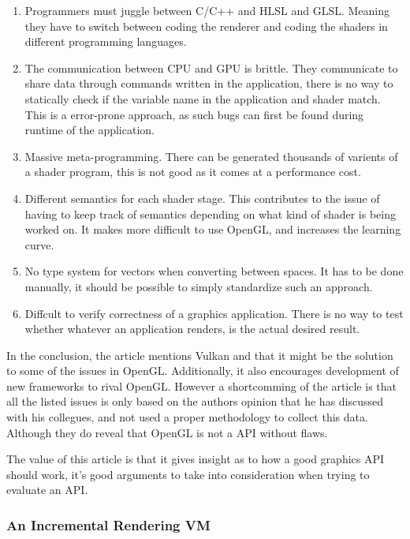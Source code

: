 \begin{enumerate}
\item Programmers must juggle between C/C++ and \gls{HLSL} and \gls{GLSL}.
Meaning they have to switch between coding the renderer and coding the shaders in different programming languages.

\item The communication between \gls{CPU} and \gls{GPU} is brittle. 
They communicate to share data through commands written in the application, there is no way to statically check if the variable name in the application and shader match.
This is a error-prone approach, as such bugs can first be found during runtime of the application.

\item Massive meta-programming. 
There can be generated thousands of varients of a shader program, this is not good as it comes at a performance cost.

\item Different semantics for each shader stage. 
This contributes to the issue of having to keep track of semantics depending on what kind of shader is being worked on.
It makes more difficult to use OpenGL, and increases the learning curve.

\item No type system for vectors when converting between spaces. 
It has to be done manually, it should be possible to simply standardize such an approach.

\item Diffcult to verify correctness of a graphics application. 
There is no way to test whether whatever an application renders, is the actual desired result.
\end{enumerate}

In the conclusion, the article mentions Vulkan and that it might be the solution to some of the issues in OpenGL. 
Additionally, it also encourages development of new frameworks to rival OpenGL. 
However a shortcomming of the article is that all the listed issues is only based on the authors opinion that he has discussed with his collegues, and not used a proper methodology to collect this data. 
Although they do reveal that OpenGL is not a \gls{API} without flaws.

The value of this article is that it gives insight as to how a good graphics \gls{API} should work, it's good arguments to take into consideration when trying to evaluate an \gls{API}.

\subsubsection{An Incremental Rendering VM}

